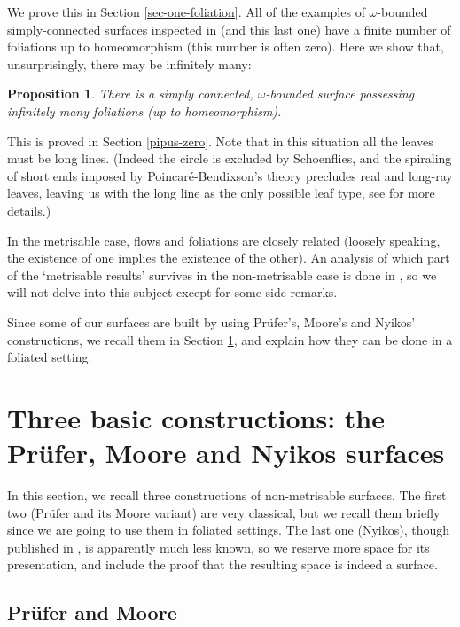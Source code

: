 \documentclass{amsart}
\newtheorem{prop}[theorem]{Proposition}
\begin{document}
We prove this in Section \ref{sec-one-foliation}. All of the examples of $\omega$-bounded simply-connected surfaces inspected in \cite{BGG} (and this last one) have a finite number of foliations up to homeomorphism (this number is often zero). Here we show that, unsurprisingly, there may be infinitely many:

\begin{prop}\label{infinitely-many-foliations}
There is a simply connected, $\omega$-bounded surface possessing infinitely many foliations (up to homeomorphism).
\end{prop}

This is proved in Section \ref{pipus-zero}. Note that in this situation all the leaves must be long lines. (Indeed the circle is excluded by Schoenflies, and the spiraling of short ends imposed by Poincar\'e-Bendixson's theory precludes real and long-ray leaves, leaving us with the long line as the only possible leaf type, see \cite{BGG, GGDynamics} for more details.)

\medskip
In the metrisable case, flows and foliations are closely related (loosely speaking, the existence of one implies the existence of the other). An analysis of which part of the `metrisable results'  survives in the non-metrisable case is done in \cite{GGDynamics}, so we will not delve into this subject except for some side remarks.

Since some of our surfaces are built by using Pr\"ufer's, Moore's and Nyikos' constructions, we recall them in Section \ref{Nyikos}, and explain how they can be done in a foliated setting.

\section{Three basic constructions: the Pr\"ufer, Moore and Nyikos surfaces}\label{Nyikos}

In this section, we recall three constructions of non-metrisable surfaces. The first two (Pr\"ufer and its Moore variant) are very classical,  but we recall them briefly since we are going to use them in foliated settings. The last one (Nyikos), though published in \cite{Nyikos90}, is apparently much less known,  so we reserve more space for its presentation, and include the proof that the resulting space is indeed a surface.

\subsection{Pr\"ufer and Moore}\label{PruferMoore}
\end{document}
